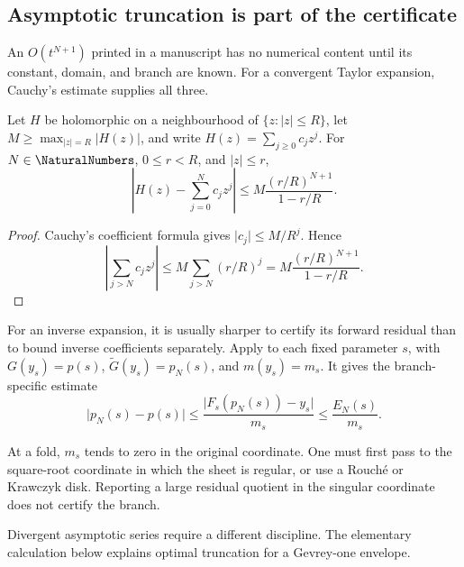 \subsection{Asymptotic truncation is part of the certificate}
\label{sec:asymptotic-truncation-discipline}

An \(O(t^{N+1})\) printed in a manuscript has no numerical content until its
constant, domain, and branch are known.  For a convergent Taylor expansion,
Cauchy's estimate supplies all three.

\begin{theorem}
\label{thm:cauchy-truncation-tail}
Let \(H\) be holomorphic on a neighbourhood of
\(\{z:\lvert z\rvert\le R\}\), let
\(M\ge\max_{\lvert z\rvert=R}\lvert H(z)\rvert\), and write
\(H(z)=\sum_{j\ge0}c_jz^j\).  For \(N\in\NaturalNumbers\), \(0\le r<R\), and
\(\lvert z\rvert\le r\),
\[
 \left\lvert H(z)-\sum_{j=0}^{N}c_jz^j\right\rvert
 \le M\frac{(r/R)^{N+1}}{1-r/R}.
\]
\end{theorem}

\begin{proof}
Cauchy's coefficient formula gives \(\lvert c_j\rvert\le M/R^j\).  Hence
\[
 \left\lvert\sum_{j>N}c_jz^j\right\rvert
 \le M\sum_{j>N}(r/R)^j
 =M\frac{(r/R)^{N+1}}{1-r/R}.
\]
\end{proof}

For an inverse expansion, it is usually sharper to certify its forward
residual than to bound inverse coefficients separately.  Apply
 to each fixed parameter $s$, with
$G(y_s)=p(s)$, $\widetilde G(y_s)=p_N(s)$, and $m(y_s)=m_s$.  It gives the
branch-specific estimate
\[
 \lvert p_N(s)-p(s)\rvert
 \le \frac{\lvert F_s(p_N(s))-y_s\rvert}{m_s}
 \le \frac{E_N(s)}{m_s}.
\]

At a fold, \(m_s\) tends to zero in the original coordinate.  One must first
pass to the square-root coordinate in which the sheet is regular, or use a
Rouch\'e or Krawczyk disk.  Reporting a large residual quotient in the singular
coordinate does not certify the branch.

Divergent asymptotic series require a different discipline.  The elementary
calculation below explains optimal truncation for a Gevrey-one envelope.

